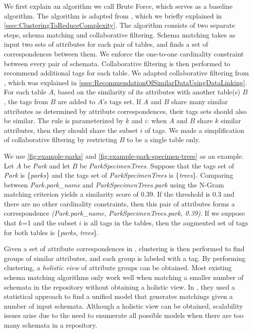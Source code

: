 We first explain an algorithm we call Brute Force, which serves as a baseline algorithm. The algorithm is adapted from \cite{Smith2011Unity}, which we briefly explained in \autoref{ssec:ClusteringToReduceComplexity}. The algorithm consists of two separate steps, schema matching and collaborative filtering. Schema matching takes as input two sets of attributes for each pair of tables, and finds a set of correspondences between them. We enforce the one-to-one cardinality constraint between every pair of schemata. Collaborative filtering is then performed to recommend additional tags for each table. We adapted collaborative filtering from \cite{conf/esws/EllefiBDT16}, which was explained in \autoref{ssec:RecommendationOfSimilarDataUsingDataLinking}. For each table $A$, based on the similarity of its attributes with another table(s) $B$, the tags from $B$ are added to $A$'s tags set. If $A$ and $B$ share many similar attributes as determined by attribute correspondences, their tags sets should also be similar. The rule is parameterized by $k$ and $i$: when $A$ and $B$ share $k$ similar attributes, then they should share the subset $i$ of tags. We made a simplification of collaborative filtering by restricting $B$ to be a single table only.

We use \autoref{fig:example-parks} and \autoref{fig:example-park-specimen-trees} as an example. Let $A$ be \textit{Park} and let $B$ be \textit{ParkSpecimenTrees}. Suppose that the tags set of \textit{Park} is \{\textit{parks}\} and the tags set of \textit{ParkSpecimenTrees} is \{\textit{trees}\}. Comparing between \textit{Park.park\_name} and \textit{ParkSpecimenTrees.park} using the N-Gram matching criterion yields a similarity score of 0.39. If the threshold is 0.3 and there are no other cardinality constraints, then this pair of attributes forms a correspondence \textit{(Park.park\_name, ParkSpecimenTrees.park, 0.39)}. If we suppose that $k$=1 and the subset $i$ is all tags in the tables, then the augmented set of tags for both tables is \{\textit{parks}, \textit{trees}\}.

Given a set of attribute correspondences in \cite{Smith2011Unity}, clustering is then performed to find groups of similar attributes, and each group is labeled with a tag. By performing clustering, a \textit{holistic view} of attribute groups can be obtained. Most existing schema matching algorithms only work well when matching a smaller number of schemata in the repository without obtaining a holistic view. In \cite{10.1145/2396761.2398468}, they used a statistical approach to find a unified model that generates matchings given a number of input schemata. Although a holistic view can be obtained, scalability issues arise due to the need to enumerate all possible models when there are too many schemata in a repository.

